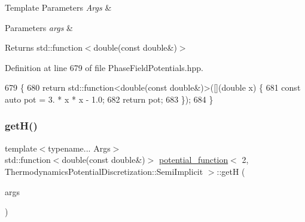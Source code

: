 \begin{DoxyTemplParams}{Template Parameters}
{\em Args} & \\
\hline
\end{DoxyTemplParams}

\begin{DoxyParams}{Parameters}
{\em args} & \\
\hline
\end{DoxyParams}
\begin{DoxyReturn}{Returns}
std\+::function$<$double(const double\&)$>$ 
\end{DoxyReturn}


Definition at line 679 of file Phase\+Field\+Potentials.\+hpp.


\begin{DoxyCode}
679                                                         \{
680     \textcolor{keywordflow}{return} std::function<double(const double&)>([](\textcolor{keywordtype}{double} x) \{
681       \textcolor{keyword}{const} \textcolor{keyword}{auto} pot = 3. * x * x - 1.0;
682       \textcolor{keywordflow}{return} pot;
683     \});
684   \}
\end{DoxyCode}
\mbox{\label{structpotential__function_3_012_00_01ThermodynamicsPotentialDiscretization_1_1SemiImplicit_01_4_a0443acadfdca63ee670104434d74ae80}} 
\subsubsection{\texorpdfstring{get\+H()}{getH()}}
{\footnotesize\ttfamily template$<$typename... Args$>$ \\
std\+::function$<$double(const double\&)$>$ \hyperlink{structpotential__function}{potential\+\_\+function}$<$ 2, Thermodynamics\+Potential\+Discretization\+::\+Semi\+Implicit $>$\+::getH (\begin{DoxyParamCaption}\item[{Args...}]{args }\end{DoxyParamCaption})\hspace{0.3cm}{\ttfamily [inline]}}



